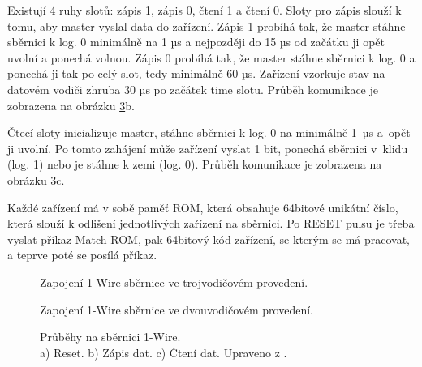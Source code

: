 Existují 4 ruhy slotů: zápis 1, zápis 0, čtení 1 a čtení 0. Sloty pro zápis slouží k tomu, aby master vyslal data do zařízení. Zápis 1 probíhá tak, že master stáhne sběrnici k log. 0 minimálně na 1 µs a nejpozději do 15 µs od začátku ji opět uvolní a ponechá volnou. Zápis 0 probíhá tak, že master stáhne sběrnici k log. 0 a ponechá ji tak po celý slot, tedy minimálně 60 µs. Zařízení vzorkuje stav na datovém vodiči zhruba 30 µs po začátek time slotu. Průběh komunikace je zobrazena na obrázku \ref{fig:1-wire-reset-vysilani-prijem-dat}b.

Čtecí sloty inicializuje master, stáhne sběrnici k log. 0 na minimálně 1~µs a~opět ji uvolní. Po tomto zahájení může zařízení vyslat 1 bit, ponechá sběrnici v~klidu (log. 1) nebo je stáhne k zemi (log. 0). Průběh komunikace je zobrazena na obrázku \ref{fig:1-wire-reset-vysilani-prijem-dat}c.

Každé zařízení má v sobě paměť ROM, která obsahuje 64bitové unikátní číslo, která slouží k odlišení jednotlivých zařízení na sběrnici. Po RESET pulsu je třeba vyslat příkaz Match ROM, pak 64bitový kód zařízení, se kterým se má pracovat, a teprve poté se posílá příkaz.


\begin{figure}[H]
    \centering
    \def\svgwidth{\columnwidth}
    
    \caption{Zapojení 1-Wire sběrnice ve trojvodičovém provedení.}
    \label{fig:1-wire-sbernice-tri-vodice}
\end{figure}

\begin{figure}[H]
    \centering
    \def\svgwidth{\columnwidth}
    
    \caption{Zapojení 1-Wire sběrnice ve dvouvodičovém provedení.}
    \label{fig:1-wire-sbernice-dva-vodice}
\end{figure}



\begin{figure}[H]
    \centering
    \def\svgwidth{\columnwidth}
    
    \caption{Průběhy na sběrnici 1-Wire. \\ 
    a) Reset. b) Zápis dat. c) Čtení dat. Upraveno z \cite{1-wire-sbernice-prubehy}.}
    \label{fig:1-wire-reset-vysilani-prijem-dat}
\end{figure}

